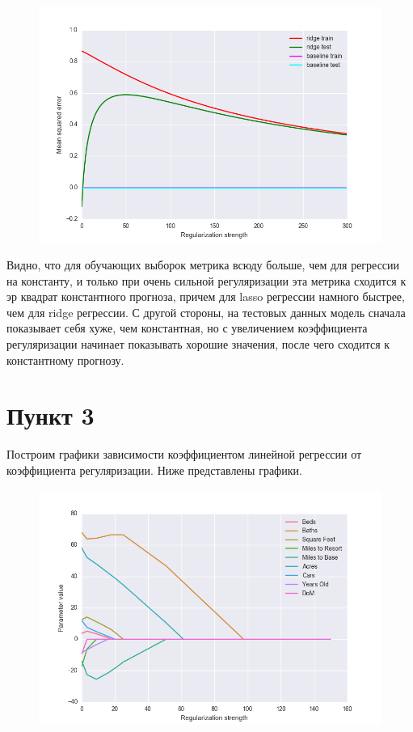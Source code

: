\documentclass[a4paper, 12pt, oneside]{scrartcl}
\numberwithin{equation}{section}
\numberwithin{table}{section}
\numberwithin{figure}{section}
\begin{document}
\begin{figure}[h]
    \centering
    \includegraphics[width=\linewidth]{rss_ridge.png}
\end{figure}

\newpage
Видно, что для обучающих выборок метрика всюду больше, чем для регрессии на константу, и только при очень сильной регуляризации эта метрика сходится 
к эр квадрат константного прогноза, причем для lasso регрессии намного быстрее, чем для ridge регрессии. С другой стороны, на тестовых данных модель сначала 
показывает себя хуже, чем константная, но с увеличением коэффициента регуляризации начинает показывать хорошие значения, после чего сходится к константному прогнозу.

\section*{Пункт 3}
Построим графики зависимости коэффициентом линейной регрессии от коэффициента регуляризации. Ниже представлены графики.
\begin{figure}[H]
    \centering
    \includegraphics[width=\linewidth]{Lasso_params.png}
\end{figure}
\end{document}
